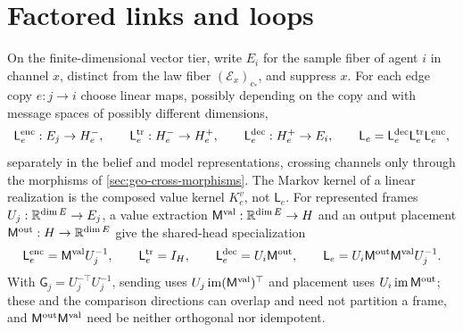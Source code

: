 \section{Factored links and loops}
\label{sec:selective-matrix-links}

On the finite-dimensional vector tier, write \(E_i\) for the sample fiber of
agent \(i\) in channel \(x\), distinct from the law fiber
\((\mathcal E_x)_{c_*}\), and suppress \(x\). For each edge copy \(e:j\to i\)
choose linear maps, possibly depending on the copy and with message spaces of
possibly different dimensions,
\begin{equation}
\mathsf L^{\rm enc}_e:E_j\to H_e^-,\qquad
\mathsf L^{\rm tr}_e:H_e^-\to H_e^+,\qquad
\mathsf L^{\rm dec}_e:H_e^+\to E_i,\qquad
\mathsf L_e=\mathsf L^{\rm dec}_e\mathsf L^{\rm tr}_e\mathsf L^{\rm enc}_e,
\label{eq:geo-selective-factorization}
\end{equation}
separately in the belief and model representations, crossing channels only
through the morphisms of \cref{sec:geo-cross-morphisms}. The Markov kernel of
a linear realization is the composed value kernel \(K^v_e\), not
\(\mathsf L_e\). For represented frames \(U_j:\mathbb R^{\dim E}\to E_j\), a value
extraction \(\mathsf M^{\rm val}:\mathbb R^{\dim E}\to H\) and an output placement
\(\mathsf M^{\rm out}:H\to\mathbb R^{\dim E}\) give the shared-head specialization
\begin{equation}
\mathsf L^{\rm enc}_e=\mathsf M^{\rm val}U_j^{-1},\qquad
\mathsf L^{\rm tr}_e=I_H,\qquad
\mathsf L^{\rm dec}_e=U_i\mathsf M^{\rm out},\qquad
\mathsf L_e=U_i\mathsf M^{\rm out}\mathsf M^{\rm val}U_j^{-1}.
\label{eq:geo-selective-attention-link}
\end{equation}
With \(\mathsf G_j=U_j^{-\top}U_j^{-1}\), sending uses
\(U_j\operatorname{im}(\mathsf M^{\rm val})^\top\) and placement uses
\(U_i\operatorname{im}\mathsf M^{\rm out}\); these and the comparison directions
can overlap and need not partition a frame, and
\(\mathsf M^{\rm out}\mathsf M^{\rm val}\) need be neither orthogonal nor
idempotent.

